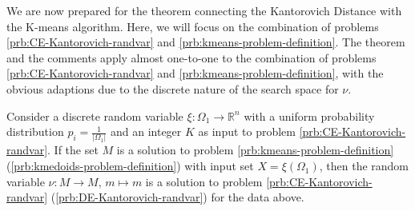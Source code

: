 We are now prepared for the theorem connecting the Kantorovich Distance with the K-means algorithm.
Here, we will focus on the combination of problems \ref{prb:CE-Kantorovich-randvar} and \ref{prb:kmeans-problem-definition}.
The theorem and the comments apply almost one-to-one to the combination of problems \ref{prb:CE-Kantorovich-randvar} and \ref{prb:kmeans-problem-definition}, with the obvious adaptions due to the discrete nature of the search space for $\nu$.
\begin{thm}
  \label{thm:kmeans-kantorovich}
  Consider a discrete random variable $\xi : \Omega_1\rightarrow \mathbb{R}^n$ with a uniform probability distribution $p_i = \frac{1}{|\Omega_1|}$ and an integer $K$ as input to problem \ref{prb:CE-Kantorovich-randvar}.
  If the set $M$ is a solution to problem \ref{prb:kmeans-problem-definition} (\ref{prb:kmedoids-problem-definition}) with input set $X=\xi(\Omega_1)$, then the random variable $\nu : M \rightarrow M,\, m\mapsto m$ is a solution to problem \ref{prb:CE-Kantorovich-randvar} (\ref{prb:DE-Kantorovich-randvar}) for the data above.
\end{thm}
